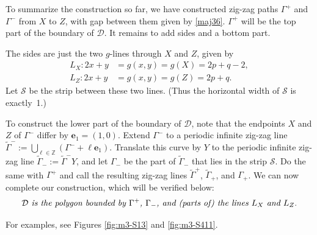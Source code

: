 \documentclass[11pt,reqno,tbtags,a4paper]{amsart}
\numberwithin{equation}{section}
\theoremstyle{plain}%
\theoremstyle{definition}
\theoremstyle{remark}
\newcommand\bbZ{\mathbb Z}
\newcommand\gG{\Gamma}
\newcommand\cD{\mathcal D}
\newcommand\cS{{\mathcal S}}
\newcommand\ve{\mathbf{e}}
\newcommand\tgG{\widetilde{\gG}}
\newcommand\0{{\boldsymbol 0}}
\newcommand\1{{\boldsymbol 1}}
\begin{document}
To summarize the construction so far, we have constructed zig-zag paths
$\gG^+$ and $\gG^-$ from $X$ to $Z$, with gap between them given by 
\eqref{maj36}.
$\gG^+$ will be the top part of the boundary of $\cD$. 
It remains to add sides and a bottom part.

The sides are just the two
$g$-lines through $X$ and $Z$,
given by
\begin{align}
L_X:2x+y&=  g(x,y)=g(X)=2p+q-2,\label{maj37}
\\
L_Z:2x+y&=  g(x,y)=g(Z)=2p+q.\label{maj38}
\end{align}
%
Let $\cS$ be the strip between these two lines.
(Thus the horizontal width of $\cS$ is exactly~1.)

To construct the lower part of the boundary of $\cD$,
note that the endpoints $X$ and $Z$ of $\gG^-$ differ by $\ve_1=(1,0)$.
Extend $\gG^-$ to a periodic infinite zig-zag line
$\tgG^-:=\bigcup_{\ell\in\bbZ}(\gG^-+\ell\ve_1)$.
Translate this curve by $Y$ to the periodic infinite zig-zag line
$\tgG_-:=\tgG^-Y$, and let $\gG_-$ be the part of $\tgG_-$ 
that lies in the strip $\cS$.
Do the same with $\gG^+$ and call the resulting zig-zag lines 
$\tgG^+$, $\tgG_+$, and $\gG_+$.  
We can now complete our construction, which will be verified below:
\begin{align}\label{cD}
\cD  
\text{\emph{ is the polygon bounded by $\gG^+$, $\gG_-$, and (parts of) 
the lines $L_X$ and $L_Z$}.}
\end{align}

For examples, see Figures \ref{fig:m3-S13} and \ref{fig:m3-S411}.
\end{document}
